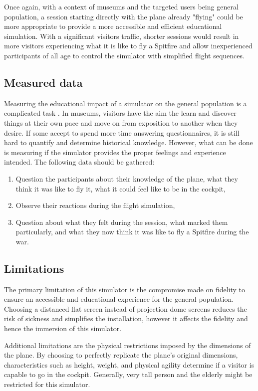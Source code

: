 \documentclass[authoryear,preprint]{sigplanconf}
\begin{document}
Once again, with a context of museums and the targeted users being general population, a session starting directly with the plane already "flying" could be more appropriate to provide a more accessible and efficient educational simulation. With a  significant visitors traffic, shorter sessions would result in more visitors experiencing what it is like to fly a Spitfire and allow inexperienced participants of all age to control the simulator with simplified flight sequences.

\subsection{Measured data}

Measuring the educational impact of a simulator on the general population is a complicated task \cite{MemoMus} \cite{Zoo}. In museums, visitors have the aim the learn and discover things at their own pace and move on from exposition to another when they desire. If some accept to spend more time answering questionnaires, it is still hard to quantify and determine historical knowledge. However, what can be done is measuring if the simulator provides the proper feelings and experience intended. The following data should be gathered:
\begin{enumerate}
    \item Question the participants about their knowledge of the plane, what they think it was like to fly it, what it could feel like to be in the cockpit,
    \item Observe their reactions during the flight simulation,
    \item Question about what they felt during the session, what marked them particularly, and what they now think it was like to fly a Spitfire during the war.
\end{enumerate}

\subsection{Limitations}

The primary limitation of this simulator is the compromise made on fidelity to ensure an accessible and educational experience for the general population. Choosing a distanced flat screen instead of projection dome screens reduces the risk of sickness and simplifies the installation, however it affects the fidelity and hence the immersion of this simulator.

Additional limitations are the physical restrictions imposed by the dimensions of the plane. By choosing to perfectly replicate the plane's original dimensions, characteristics such as height, weight, and physical agility determine if a visitor is capable to go in the cockpit. Generally, very tall person and the elderly might be restricted for this simulator.
\end{document}
